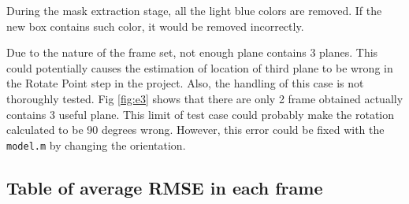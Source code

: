 \documentclass[10pt,a4paper]{article}
\begin{document}
During the mask extraction stage, all the light blue colors are removed. 
If the new box contains such color, it would be removed incorrectly.

Due to the nature of the frame set, not enough plane contains 3 planes.
This could potentially causes the estimation of location of third plane to be wrong in the Rotate Point step in the project.
Also, the handling of this case is not thoroughly tested. 
Fig \ref{fig:e3} shows that there are only 2 frame obtained actually contains 3 useful plane.
This limit of test case could probably make the rotation calculated to be 90 degrees wrong.
However, this error could be fixed with the {\tt model.m} by changing the orientation.

\newpage

\subsection{Table of average RMSE in each frame}
\end{document}
